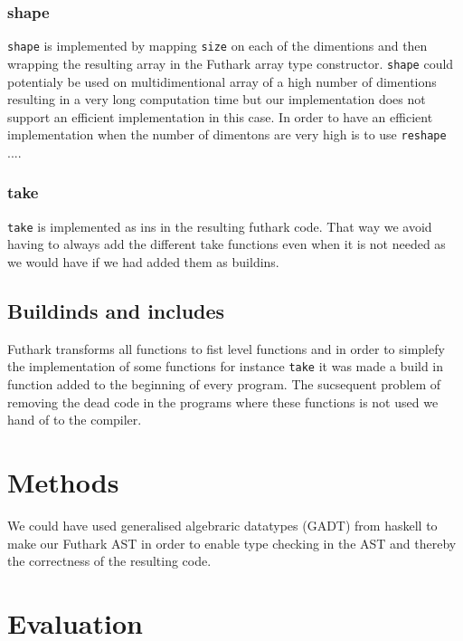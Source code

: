 \documentclass[11pt]{article}
\begin{document}
\subsubsection{shape}
\verb|shape| is implemented by mapping \verb|size| on each of the dimentions and then wrapping the resulting array in the Futhark array type constructor. 
\verb|shape| could potentialy be used on multidimentional array of a high number of dimentions resulting in a very long computation time but our implementation does not support an efficient implementation in this case. In order to have an efficient implementation when the number of dimentons are very high is to use \verb|reshape| .... \\

\subsubsection{take}
\verb|take| is implemented as ins in the resulting futhark code. That way we avoid having to always add the different take functions even when it is not needed as we would have if we had added them as buildins. 

\subsection{Buildinds and includes}
Futhark transforms all functions to fist level functions and in order to simplefy the implementation of some functions for instance \verb|take| it was made a build in function added to the beginning of every program. The sucsequent problem of removing the dead code in the programs where these functions is not used we hand of to the compiler.



\section{Methods}
We could have used generalised algebraric datatypes (GADT) from haskell to make our Futhark AST in order to enable type checking in the AST and thereby the correctness of the resulting code. 

\section{Evaluation}
\end{document}
